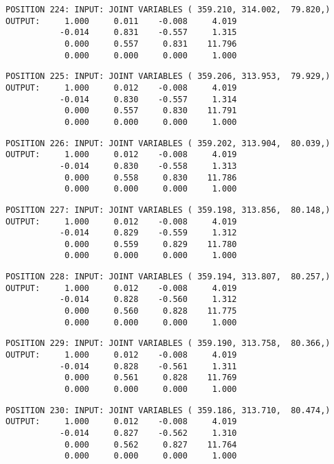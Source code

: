 \begin{verbatim}
POSITION 224: INPUT: JOINT VARIABLES ( 359.210, 314.002,  79.820,)
OUTPUT:     1.000     0.011    -0.008     4.019
           -0.014     0.831    -0.557     1.315
            0.000     0.557     0.831    11.796
            0.000     0.000     0.000     1.000
\end{verbatim} \pagebreak[1]\begin{verbatim}
POSITION 225: INPUT: JOINT VARIABLES ( 359.206, 313.953,  79.929,)
OUTPUT:     1.000     0.012    -0.008     4.019
           -0.014     0.830    -0.557     1.314
            0.000     0.557     0.830    11.791
            0.000     0.000     0.000     1.000
\end{verbatim} \pagebreak[1]\begin{verbatim}
POSITION 226: INPUT: JOINT VARIABLES ( 359.202, 313.904,  80.039,)
OUTPUT:     1.000     0.012    -0.008     4.019
           -0.014     0.830    -0.558     1.313
            0.000     0.558     0.830    11.786
            0.000     0.000     0.000     1.000
\end{verbatim} \pagebreak[1]\begin{verbatim}
POSITION 227: INPUT: JOINT VARIABLES ( 359.198, 313.856,  80.148,)
OUTPUT:     1.000     0.012    -0.008     4.019
           -0.014     0.829    -0.559     1.312
            0.000     0.559     0.829    11.780
            0.000     0.000     0.000     1.000
\end{verbatim} \pagebreak[1]\begin{verbatim}
POSITION 228: INPUT: JOINT VARIABLES ( 359.194, 313.807,  80.257,)
OUTPUT:     1.000     0.012    -0.008     4.019
           -0.014     0.828    -0.560     1.312
            0.000     0.560     0.828    11.775
            0.000     0.000     0.000     1.000
\end{verbatim} \pagebreak[1]\begin{verbatim}
POSITION 229: INPUT: JOINT VARIABLES ( 359.190, 313.758,  80.366,)
OUTPUT:     1.000     0.012    -0.008     4.019
           -0.014     0.828    -0.561     1.311
            0.000     0.561     0.828    11.769
            0.000     0.000     0.000     1.000
\end{verbatim} \pagebreak[1]\begin{verbatim}
POSITION 230: INPUT: JOINT VARIABLES ( 359.186, 313.710,  80.474,)
OUTPUT:     1.000     0.012    -0.008     4.019
           -0.014     0.827    -0.562     1.310
            0.000     0.562     0.827    11.764
            0.000     0.000     0.000     1.000
\end{verbatim} \pagebreak[1]\begin{verbatim}

\end{verbatim}
